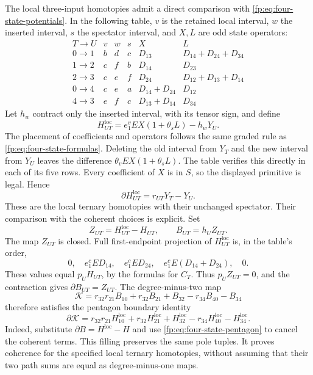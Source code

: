 The local three-input homotopies admit a direct comparison with
\eqref{fp:eq:four-state-potentials}.  In the following table,
\(v\) is the retained local interval, \(w\) the inserted interval,
\(s\) the spectator interval, and \(X,L\) are odd state operators:
\[
\begin{array}{c|ccc|c|c}
 T\to U&v&w&s&X&L\\\hline
 0\to1&b&d&c&D_{13}&D_{14}+D_{24}+D_{34}\\
 1\to2&c&f&b&D_{14}&D_{23}\\
 2\to3&c&e&f&D_{24}&D_{12}+D_{13}+D_{14}\\
 0\to4&c&e&a&D_{14}+D_{24}&D_{12}\\
 4\to3&e&f&c&D_{13}+D_{14}&D_{34}
\end{array}
\]
Let \(h_w\) contract only the inserted interval, with its tensor
sign, and define
\[
 H^{\mathrm{loc}}_{UT}=e_1^vEX(1+\theta_sL)-h_wY_U.
\]
The placement of coefficients and operators follows the same graded
rule as \eqref{fp:eq:four-state-formulas}.  Deleting the old interval
from \(Y_T\) and the new interval from \(Y_U\) leaves the
difference \(\theta_vEX(1+\theta_sL)\).  The table verifies
this directly in each of its five rows.  Every coefficient of \(X\)
is in \(S\), so the displayed primitive is legal.  Hence
\[
 \partial H^{\mathrm{loc}}_{UT}=r_{UT}Y_T-Y_U.
\]
These are the local ternary homotopies with their unchanged spectator.
Their comparison with the coherent choices is explicit.  Set
\[
 Z_{UT}=H^{\mathrm{loc}}_{UT}-H_{UT},\qquad
 B_{UT}=h_UZ_{UT}.
\]
The map \(Z_{UT}\) is closed.  Full first-endpoint projection
of \(H^{\mathrm{loc}}_{UT}\) is, in the table's order,
\[
 0,\quad e_1^cED_{14},\quad e_1^cED_{24},\quad
 e_1^cE(D_{14}+D_{24}),\quad0.
\]
These values equal \(p_UH_{UT}\), by the formulas for \(C_T\).
Thus \(p_UZ_{UT}=0\), and the contraction gives
\(\partial B_{UT}=Z_{UT}\).
The degree-minus-two map
\[
 \mathcal K=r_{32}r_{21}B_{10}+r_{32}B_{21}+B_{32}
                -r_{34}B_{40}-B_{34}
\]
therefore satisfies the pentagon boundary identity
\begin{equation}\label{fp:eq:four-local-pentagon-filling}
 \partial\mathcal K=
 r_{32}r_{21}H^{\mathrm{loc}}_{10}+r_{32}H^{\mathrm{loc}}_{21}
       +H^{\mathrm{loc}}_{32}-r_{34}H^{\mathrm{loc}}_{40}-H^{\mathrm{loc}}_{34}.
\end{equation}
Indeed, substitute \(\partial B=H^{\mathrm{loc}}-H\) and use
\eqref{fp:eq:four-state-pentagon} to cancel the coherent terms.
This filling preserves the same pole tuples.  It proves coherence
for the specified local ternary homotopies, without assuming that
their two path sums are equal as degree-minus-one maps.

